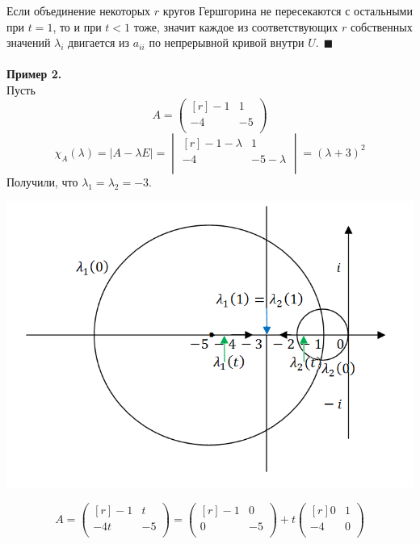 \documentclass[12pt]{article}
\theoremstyle{definition}
\numberwithin{equation}{section}
\begin{document}
	Если объединение некоторых $r$ кругов Гершгорина не пересекаются с остальными при $t=1$, то и при $t<1$ тоже, значит каждое из соответствующих $r$ собственных значений $\lambda_i$ двигается из $a_{ii}$ по непрерывной кривой внутри $U.~~\blacksquare$\\
	\\
	\textbf{Пример 2.}\\
	Пусть 
	\[A=\begin{pmatrix}[r]
	-1 & 1 \\
	-4 & -5 \\
	\end{pmatrix}\]
	\[\chi_A(\lambda)=|A-\lambda E|=\begin{vmatrix}[r]
	-1-\lambda & 1 \\
	-4 & -5-\lambda \\
	\end{vmatrix}=(\lambda +3)^2\]
	Получили, что $\lambda_1=\lambda_2=-3$.
	\begin{center}
		\includegraphics[scale=0.8]{l9_5.png}
	\end{center}
	\[A=\begin{pmatrix}[r]
	-1 & t \\
	-4t & -5 \\
	\end{pmatrix}=\begin{pmatrix}[r]
	-1 & 0 \\
	0 & -5 \\
	\end{pmatrix}+ t\begin{pmatrix}[r]
	0 & 1 \\
	-4 & 0 \\
	\end{pmatrix}\]
\end{document}
